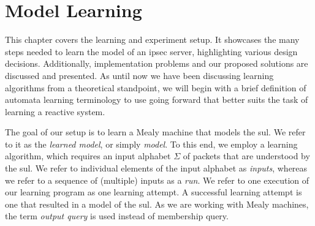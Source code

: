 %
%
% 
% 
% 

\chapter{Model Learning}

\label{chap:Learning}

This chapter covers the learning and experiment setup. It showcases the many steps needed to learn the model of an \ac{ipsec} server, highlighting various design decisions. Additionally, implementation problems and our proposed solutions are discussed and presented. As until now we have been discussing learning algorithms from a theoretical standpoint, we will begin with a brief definition of automata learning terminology to use going forward that better suits the task of learning a reactive system. 

The goal of our setup is to learn a Mealy machine that models the \ac{sul}. We refer to it as the \textit{learned model}, or simply \textit{model}. To this end, we employ a learning algorithm, which requires an input alphabet $\Sigma$ of packets that are understood by the \ac{sul}. We refer to individual elements of the input alphabet as \textit{inputs}, whereas we refer to a sequence of (multiple) inputs as a \textit{run}. We refer to one execution of our learning program as one learning attempt. A successful learning attempt is one that resulted in a model of the \ac{sul}. As we are working with Mealy machines, the term \textit{output query} is used instead of membership query.

